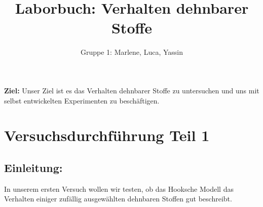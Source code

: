 \documentclass[11pt]{article}
\author{Gruppe 1: Marlene, Luca, Yassin}
\title{Laborbuch: Verhalten dehnbarer Stoffe}
\begin{document}
    
    \maketitle
    \date{}
    \tableofcontents
    \newpage

    \textbf{Ziel:}\label{ziel}
    Unser Ziel ist es das Verhalten dehnbarer Stoffe zu untersuchen und uns
    mit selbst entwickelten Experimenten zu beschäftigen.

    \section{Versuchsdurchführung Teil 1}\label{versuchsdurchfuxfchrung-teil-1}

    \subsection{Einleitung:}\label{einleitung}
    In unserem ersten Versuch wollen wir testen, ob das Hooksche Modell das
    Verhalten einiger zufällig ausgewählten dehnbaren Stoffen gut
    beschreibt.
\end{document}
